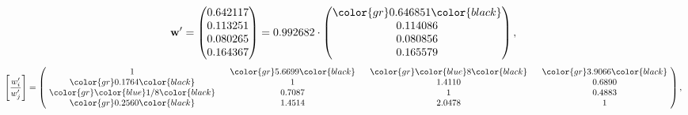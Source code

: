 \begin{example}
\begin{equation*}
\mathbf{w}^{\prime} =
\begin{pmatrix}
0.642117\\
0.113251\\
0.080265\\
0.164367
\end{pmatrix} =
0.992682\cdot
\begin{pmatrix}
\color{gr} 0.646851\color{black} \\
0.114086\\
0.080856\\
0.165579
\end{pmatrix},
\end{equation*}
\begin{equation*}
\left[ \frac{{w}^{\prime}_i}{{w}^{\prime}_j} \right] =
\begin{pmatrix}
$\,\,$ 1 $\,\,$ & $\,\,$\color{gr} 5.6699\color{black} $\,\,$ & $\,\,$\color{gr} \color{blue} 8\color{black} $\,\,$ & $\,\,$\color{gr} 3.9066\color{black} $\,\,$ \\
$\,\,$\color{gr} 0.1764\color{black} $\,\,$ & $\,\,$ 1 $\,\,$ & $\,\,$1.4110$\,\,$ & $\,\,$0.6890  $\,\,$ \\
$\,\,$\color{gr} \color{blue}  1/8\color{black} $\,\,$ & $\,\,$0.7087$\,\,$ & $\,\,$ 1 $\,\,$ & $\,\,$0.4883 $\,\,$ \\
$\,\,$\color{gr} 0.2560\color{black} $\,\,$ & $\,\,$1.4514$\,\,$ & $\,\,$2.0478$\,\,$ & $\,\,$ 1  $\,\,$ \\
\end{pmatrix},
\end{equation*}
\end{example}
\newpage
